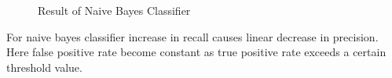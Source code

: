 \begin{figure}[H]
\centering
{}%
\hfill %
%
\caption{Result of Naive Bayes Classifier}
\label{prrn}
\end{figure}
\noindent
For naive bayes classifier increase in recall causes linear decrease in precision. Here false positive rate become constant as true positive rate exceeds a certain threshold value.   
